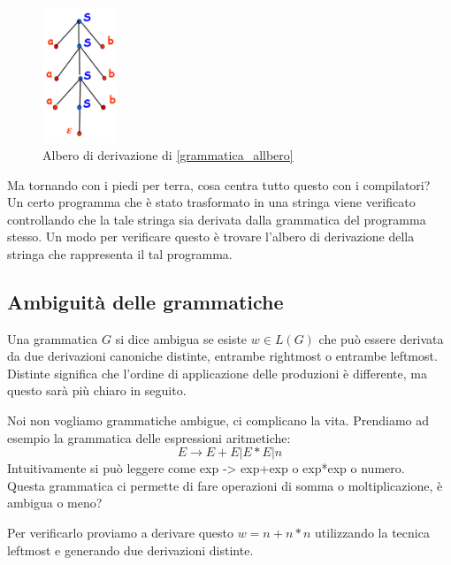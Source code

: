 \documentclass[class=book, crop=false, oneside]{standalone}
\begin{document}
\begin{figure}[H]
	\centering
	\includegraphics[width=0.2\textwidth,keepaspectratio]{albero_di_derivazione}
    \caption{Albero di derivazione di \ref{grammatica_allbero}}
    \label{albero_di_derivazione}
\end{figure}
Ma tornando con i piedi per terra, cosa centra tutto questo con i compilatori?\\
Un certo programma che è stato trasformato in una stringa viene verificato controllando che la tale stringa sia derivata dalla grammatica del programma stesso. Un modo per verificare questo è trovare l’albero di derivazione della stringa che rappresenta il tal programma.

\subsection{Ambiguità delle grammatiche}
Una grammatica $G$ si dice ambigua se esiste $w \in L(G)$ che può essere derivata da due derivazioni canoniche distinte, entrambe rightmost o entrambe leftmost. Distinte significa che l'ordine di applicazione delle produzioni è differente, ma questo sarà più chiaro in seguito.

Noi non vogliamo grammatiche ambigue, ci complicano la vita.
Prendiamo ad esempio la grammatica delle espressioni aritmetiche:
\begin{equation}
    E \to E+E | E*E |  n
\end{equation}
Intuitivamente si può leggere come exp -> exp+exp  o  exp*exp  o  numero.\\
Questa grammatica ci permette di fare operazioni di somma o moltiplicazione, è ambigua o meno?

Per verificarlo proviamo a derivare questo $w = n+n*n$ utilizzando la tecnica leftmost e generando due derivazioni distinte.
\end{document}
